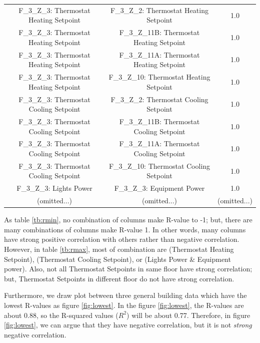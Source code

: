 \documentclass[aps, 10pt, a4paper]{article}
\begin{document}
\begin{table}[htbp]
\begin{tabular}{c|c||c}
                        F\_3\_Z\_3: Thermostat Heating Setpoint & F\_3\_Z\_2: Thermostat Heating Setpoint & 1.0 \\
                        F\_3\_Z\_3: Thermostat Heating Setpoint & F\_3\_Z\_11B: Thermostat Heating Setpoint & 1.0 \\
                        F\_3\_Z\_3: Thermostat Heating Setpoint & F\_3\_Z\_11A: Thermostat Heating Setpoint & 1.0 \\
                        F\_3\_Z\_3: Thermostat Heating Setpoint & F\_3\_Z\_10: Thermostat Heating Setpoint & 1.0 \\
                        F\_3\_Z\_3: Thermostat Cooling Setpoint & F\_3\_Z\_2: Thermostat Cooling Setpoint & 1.0 \\
                        F\_3\_Z\_3: Thermostat Cooling Setpoint & F\_3\_Z\_11B: Thermostat Cooling Setpoint & 1.0 \\
                        F\_3\_Z\_3: Thermostat Cooling Setpoint & F\_3\_Z\_11A: Thermostat Cooling Setpoint & 1.0 \\
                        F\_3\_Z\_3: Thermostat Cooling Setpoint & F\_3\_Z\_10: Thermostat Cooling Setpoint & 1.0 \\
                        F\_3\_Z\_3: Lights Power & F\_3\_Z\_3: Equipment Power & 1.0 \\
                        (omitted...) & (omitted...) &  (omitted...) \\
                    \end{tabular}
                \end{table}
                
                As table \ref{tb:rmin}, no combination of columns make R-value to -1;  but, there are many combinations of columns make R-value 1. In other words, many columns have strong positive correlation with others rather than negative correlation. However, in table \ref{tb:rmax}, most of combination are (Thermostat Heating Setpoint), (Thermostat Cooling Setpoint), or (Lights Power \& Equipment power). Also, not all Thermostat Setpoints in same floor have strong correlation; but, Thermostat Setpoints in different floor do not have strong correlation. 
            
                Furthermore, we draw plot between three general building data which have the lowest R-values as figure \ref{fig:lowest}. In the figure \ref{fig:lowest}, the R-values are about 0.88, so the R-squared values (\( R ^ 2 \)) will be about 0.77. Therefore, in figure \ref{fig:lowest}, we can argue that they have negative correlation, but it is not \textit{strong} negative correlation. 
                
\end{document}
